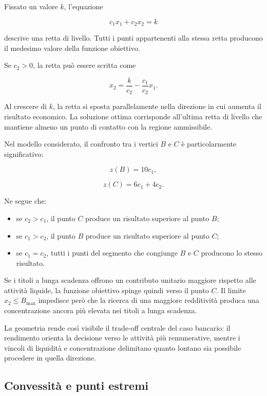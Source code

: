 Fissato un valore $k$, l'equazione

\[
c_1x_1+c_2x_2=k
\]

\noindent descrive una retta di livello. Tutti i punti appartenenti alla stessa retta
producono il medesimo valore della funzione obiettivo.

Se $c_2>0$, la retta pu\`o essere scritta come

\[
x_2
=
\frac{k}{c_2}
-
\frac{c_1}{c_2}x_1.
\]

Al crescere di $k$, la retta si sposta parallelamente nella direzione in cui
aumenta il risultato economico. La soluzione ottima corrisponde all'ultima
retta di livello che mantiene almeno un punto di contatto con la regione
ammissibile.

Nel modello considerato, il confronto tra i vertici $B$ e $C$ \`e
particolarmente significativo:

\[
z(B)=10c_1,
\]

\[
z(C)=6c_1+4c_2.
\]

Ne segue che:

\begin{itemize}

\item se $c_2>c_1$, il punto $C$ produce un risultato superiore al punto $B$;

\item se $c_1>c_2$, il punto $B$ produce un risultato superiore al punto $C$;

\item se $c_1=c_2$, tutti i punti del segmento che congiunge $B$ e $C$
producono lo stesso risultato.

\end{itemize}

Se i titoli a lunga scadenza offrono un contributo unitario maggiore rispetto
alle attivit\`a liquide, la funzione obiettivo spinge quindi verso il punto
$C$. Il limite $x_2\leq B_{\max}$ impedisce per\`o che la ricerca di una
maggiore redditivit\`a produca una concentrazione ancora pi\`u elevata nei
titoli a lunga scadenza.

La geometria rende cos\`i visibile il trade-off centrale del caso bancario:
il rendimento orienta la decisione verso le attivit\`a pi\`u remunerative,
mentre i vincoli di liquidit\`a e concentrazione delimitano quanto lontano sia
possibile procedere in quella direzione.

\subsection{Convessit\`a e punti estremi}

